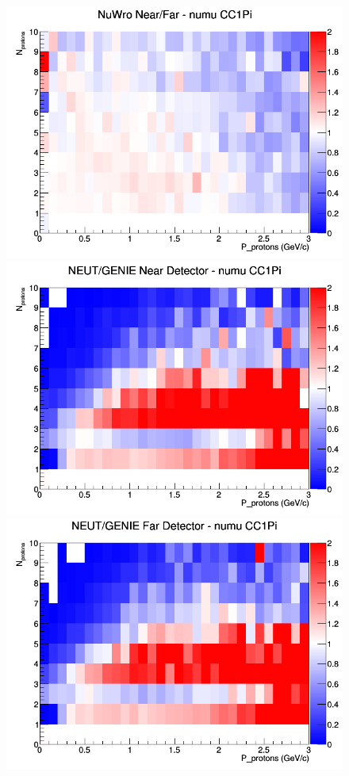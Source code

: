 \begin{figure}[h]
\endminipage
{}
\includegraphics[width=\linewidth]{N_P/nominal/protons/ratios/CC1Pi_NuWro_numu_NF_N_P.png}
\endminipage
\newline
{}
\includegraphics[width=\linewidth]{N_P/nominal/protons/ratios/CC1Pi_NEUT_GENIE_numu_near_N_P.png}
\endminipage
{}
\includegraphics[width=\linewidth]{N_P/nominal/protons/ratios/CC1Pi_NEUT_GENIE_numu_far_N_P.png}

\end{figure}
